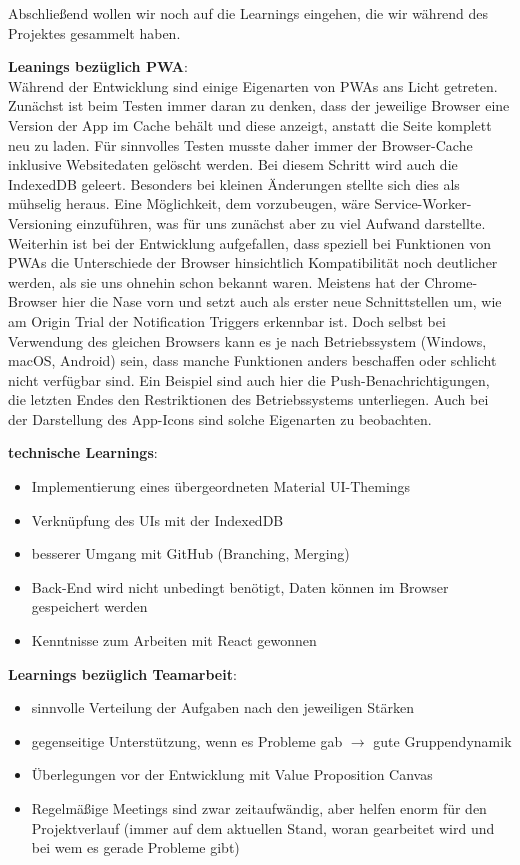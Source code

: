 Abschließend wollen wir noch auf die Learnings eingehen, die wir während des Projektes gesammelt haben. 

\textbf{Leanings bezüglich PWA}:\\
Während der Entwicklung sind einige Eigenarten von PWAs ans Licht getreten. 
Zunächst ist beim Testen immer daran zu denken, dass der jeweilige Browser eine Version der App im Cache behält und diese anzeigt, anstatt die Seite komplett neu zu laden. Für sinnvolles Testen musste daher immer der Browser-Cache inklusive Websitedaten gelöscht werden. Bei diesem Schritt wird auch die \ac{IndexedDB} geleert. Besonders bei kleinen Änderungen stellte sich dies als mühselig heraus. Eine Möglichkeit, dem vorzubeugen, wäre Service-Worker-Versioning einzuführen, was für uns zunächst aber zu viel Aufwand darstellte.
Weiterhin ist bei der Entwicklung aufgefallen, dass speziell bei Funktionen von \ac{PWA}s die Unterschiede der Browser hinsichtlich Kompatibilität noch deutlicher werden, als sie uns ohnehin schon bekannt waren. Meistens hat der Chrome-Browser hier die Nase vorn und setzt auch als erster neue Schnittstellen um, wie am Origin Trial der Notification Triggers erkennbar ist. Doch selbst bei Verwendung des gleichen Browsers kann es je nach Betriebssystem (Windows, macOS, Android) sein, dass manche Funktionen anders beschaffen oder schlicht nicht verfügbar sind. Ein Beispiel sind auch hier die Push-Benachrichtigungen, die letzten Endes den Restriktionen des Betriebssystems unterliegen. Auch bei der Darstellung des App-Icons sind solche Eigenarten zu beobachten.

\textbf{technische Learnings}:
\begin{itemize}[noitemsep]
	\item Implementierung eines übergeordneten Material UI-Themings
	\item Verknüpfung des UIs mit der IndexedDB
	\item besserer Umgang mit GitHub (Branching, Merging)
	\item Back-End wird nicht unbedingt benötigt, Daten können im Browser gespeichert werden
	\item Kenntnisse zum Arbeiten mit React gewonnen
\end{itemize}

\textbf{Learnings bezüglich Teamarbeit}:
\begin{itemize}[noitemsep]
	\item sinnvolle Verteilung der Aufgaben nach den jeweiligen Stärken
	\item gegenseitige Unterstützung, wenn es Probleme gab $\rightarrow$ gute Gruppendynamik
	\item Überlegungen vor der Entwicklung mit Value Proposition Canvas
	\item Regelmäßige Meetings sind zwar zeitaufwändig, aber helfen enorm für den Projektverlauf (immer auf dem aktuellen Stand, woran gearbeitet wird und bei wem es gerade Probleme gibt)
\end{itemize}

